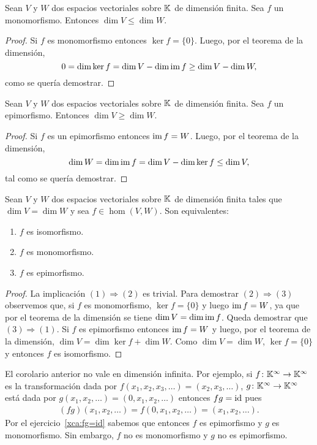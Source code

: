 \begin{cor}
	\label{cor:no_monomorfismo}
	Sean $V$ y $W$ dos espacios vectoriales sobre $\mathbb{K}$ de dimensión finita. 
	Sea $f$ un monomorfismo. Entonces $\dim V\leq \dim W$.

	\begin{proof}
        Si $f$ es monomorfismo entonces $\ker f=\{0\}$. Luego,  
		por el teorema de la dimensión,
		\[
			0=\dim\ker f=\dim V-\dim\operatorname{im} f\geq \dim V-\dim W,
		\]
		como se quería demostrar.
	\end{proof}
\end{cor}

\begin{cor}
	\label{cor:no_epimorfismo}
	Sean $V$ y $W$ dos espacios vectoriales sobre $\mathbb{K}$ de dimensión finita. Sea $f$ un epimorfismo. Entonces
    $\dim V\geq\dim W$.

	\begin{proof}
        Si $f$ es un epimorfismo entonces $\operatorname{im} f=W$. Luego, por el teorema de la dimensión,
		\[
			\dim W=\dim\operatorname{im} f=\dim V-\dim\ker f\leq \dim V,
		\]
		tal como se quería demostrar.
	\end{proof}
\end{cor}

\begin{cor}
    \label{cor:mono<=>epi<=>iso}
	Sean $V$ y $W$ dos espacios vectoriales sobre $\mathbb{K}$ de dimensión finita tales que $\dim V=\dim
	W$ y sea $f\in\hom(V,W)$. Son equivalentes:
	\begin{enumerate}
		\item $f$ es isomorfismo.
		\item $f$ es monomorfismo.
		\item $f$ es epimorfismo.
	\end{enumerate}

	\begin{proof}
		La implicación $(1)\Rightarrow(2)$ es trivial. Para demostrar
		$(2)\Rightarrow(3)$ observemos que, si $f$ es monomorfismo, $\ker
		f=\{0\}$ y luego $\operatorname{im} f=W$, ya que por el teorema de la dimensión se
		tiene $\dim V=\dim\operatorname{im} f$. Queda demostrar que $(3)\Rightarrow(1)$. Si
		$f$ es epimorfismo entonces $\operatorname{im} f=W$ y luego, por el teorema de la
		dimensión, $\dim V=\dim\ker f+\dim W$. Como $\dim V=\dim W$, $\ker
		f=\{0\}$ y entonces $f$ es isomorfismo.
	\end{proof}
\end{cor}

\begin{example}
	El corolario anterior no vale en dimensión infinita. Por ejemplo, si
	$f\colon\mathbb{K}^{\infty}\to\mathbb{K}^{\infty}$ es la transformación dada por
	$f(x_1,x_2,x_3,\dots)=(x_2,x_3,\dots)$, $g\colon\mathbb{K}^{\infty}\to\mathbb{K}^{\infty}$
	está dada por $g(x_1,x_2,\dots)=(0,x_1,x_2,\dots)$ entonces $fg=\operatorname{id}$ pues 
	\begin{align*}
		(fg)(x_1,x_2,\dots)=f(0,x_1,x_2,\dots)=(x_1,x_2,\dots).
	\end{align*}
	Por el ejercicio~\ref{xca:fg=id} sabemos que entonces $f$ es epimorfismo y
	$g$ es monomorfismo.  Sin embargo, $f$ no es monomorfismo y $g$ no es
	epimorfismo.
\end{example}

